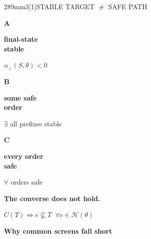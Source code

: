 \documentclass[final]{beamer}
\newcommand{\Subhead}{\PosterCondensed\bfseries\fontsize{38pt}{41pt}\selectfont}
\newcommand{\HeroEquation}{\fontsize{44pt}{48pt}\selectfont}
\newcommand{\TableSize}{\fontsize{26pt}{29pt}\selectfont}
\newcommand{\FigureSize}{\fontsize{24.7pt}{27.2pt}\selectfont}
\begin{document}
\begin{frame}[t]
\begin{minipage}[t][289mm][t]{226mm}
\begin{PosterPanel}{289mm}{3}{\scalebox{0.86}[1]{STABLE TARGET $\ne$ SAFE PATH}}
\begin{minipage}[t]{\linewidth}
      \begin{minipage}[c][50mm][c]{63mm}\centering
        \colorbox{IASPaleGreen}{\parbox[c][48mm][c]{59mm}{\centering
          {\HeroEquation\bfseries\color{IASMidGreen}A\par}
          {\TableSize\bfseries\color{IASDarkText}final-state\\stable\par}
          {\FigureSize$\alpha_{\perp}(S,\theta)<0$}}}
      \end{minipage}\hspace{1mm}%
      \begin{minipage}[c][50mm][c]{63mm}\centering
        \colorbox{IASPaleGreen}{\parbox[c][48mm][c]{59mm}{\centering
          {\HeroEquation\bfseries\color{IASBlue}B\par}
          {\TableSize\bfseries\color{IASDarkText}some safe\\order\par}
          {\FigureSize$\exists$ all prefixes stable}}}
      \end{minipage}\hspace{1mm}%
      \begin{minipage}[c][50mm][c]{63mm}\centering
        \colorbox{IASPaleGold}{\parbox[c][48mm][c]{59mm}{\centering
          {\HeroEquation\bfseries\color{IASGold!70!black}C\par}
          {\TableSize\bfseries\color{IASDarkText}every order\\safe\par}
          {\FigureSize$\forall$ orders safe}}}
      \end{minipage}
    \end{minipage}\par
    {\TableSize\bfseries\color{IASVermillion}The converse does not hold.\par}
    \vspace{1mm}
    \colorbox{IASPaleGreen}{\parbox[c][22mm][c]{\dimexpr\linewidth-2\fboxsep\relax}{\centering
      {\TableSize$C(T)\Longleftrightarrow e\nsubseteq T\;\;\forall e\in\mathcal H(\theta)$}}}
    \vspace{1mm}
    {\Subhead\color{IASDarkGreen}Why common screens fall short\par}
    {\PosterCondensed\TableSize\renewcommand{\arraystretch}{1.04}
      \begin{tabularx}{\linewidth}{@{}>{\RaggedRight\arraybackslash}p{55mm}>{\RaggedRight\arraybackslash}p{71mm}>{\RaggedRight\arraybackslash}X@{}}

\end{tabularx}}
\end{PosterPanel}
\end{minipage}
\end{frame}
\end{document}
